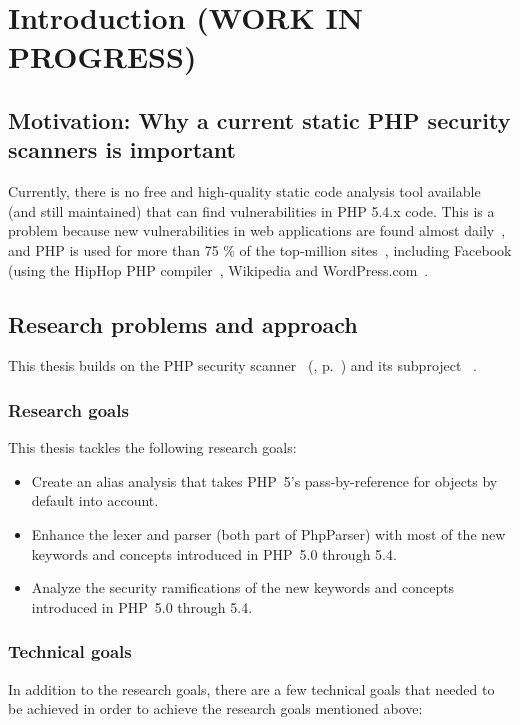 \chapter{Introduction (WORK IN PROGRESS)}

\section{Motivation: Why a current static PHP security scanners is important}
Currently, there is no free and high-quality static code analysis tool available (and still maintained) that can find vulnerabilities in PHP 5.4.x code. This is a problem because new vulnerabilities in web applications are found almost daily~\cite{osvdb}, and PHP is used for more than 75 \% of the top-million sites~\cite{w3techs-php-usage}, including Facebook (using the HipHop PHP compiler~\cite{hiphop}, Wikipedia and WordPress.com~\cite{w3techs-php-sites}.

\section{Research problems and approach}

This thesis builds on the PHP security scanner ~(\cite{pixy}, p.~\pageref{pixy}) and its subproject ~\cite{phpparser}.

\subsection{Research goals}

This thesis tackles the following research goals:

\begin{itemize}
 \item Create an alias analysis that takes PHP~5's pass-by-reference for objects by default into account.
 \item Enhance the lexer and parser (both part of PhpParser) with most of the new keywords and concepts introduced in PHP~5.0 through 5.4.
 \item Analyze the security ramifications of the new keywords and concepts introduced in PHP~5.0 through 5.4.
\end{itemize}

\subsection{Technical goals}

In addition to the research goals, there are a few technical goals that needed to be achieved in order to achieve the research goals mentioned above:

